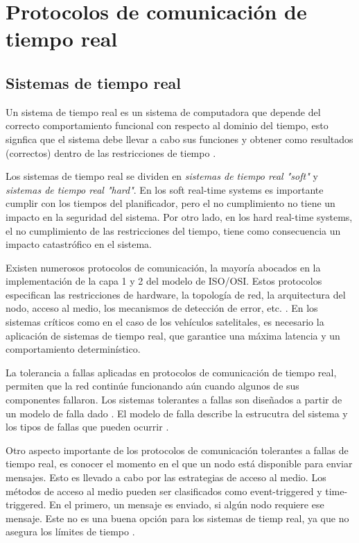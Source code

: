 \section{Protocolos de comunicación de tiempo real}
\subsection{Sistemas de tiempo real}
Un sistema de tiempo real es un sistema de computadora que depende del correcto comportamiento funcional con respecto al dominio del tiempo, esto signfica que el sistema debe llevar a cabo sus funciones y obtener como resultados (correctos) dentro de las restricciones de tiempo \citep{Lisner07}.

Los sistemas de tiempo real se dividen en \textit{sistemas de tiempo real "soft"} y \textit{sistemas de tiempo real "hard"}. En los soft real-time systems es importante cumplir con los tiempos del planificador, pero el no cumplimiento no tiene un impacto en la seguridad del sistema. Por otro lado, en los hard real-time systems, el no cumplimiento de las restricciones del tiempo, tiene como consecuencia un impacto catastrófico en el sistema.

Existen numerosos protocolos de comunicación, la mayoría abocados en  la implementación de la capa 1 y 2 del modelo de ISO/OSI. Estos protocolos especifican las restricciones de hardware, la topología de red, la arquitectura del nodo, acceso al medio, los mecanismos de detección  de error, etc. \citep{Lisner07}. En los sistemas críticos como en el caso de los vehículos satelitales, es necesario la aplicación de sistemas de tiempo real, que garantice una máxima latencia y un comportamiento determinístico.

La tolerancia a fallas aplicadas en protocolos de comunicación de tiempo real, permiten que la red continúe funcionando aún cuando algunos de sus componentes fallaron. Los sistemas tolerantes a fallas son diseñados a partir de un modelo de falla dado \citep{Lisner07}. El modelo de falla describe la estrucutra del sistema y los tipos de fallas que pueden ocurrir \citep{Lisner07}.

Otro aspecto importante de los protocolos de comunicación tolerantes a fallas de tiempo real, es conocer el momento en el que un nodo está disponible para enviar mensajes. Esto es llevado a cabo por las estrategias de acceso al medio. Los métodos de acceso al medio pueden ser clasificados como event-triggered y time-triggered. En el primero, un mensaje es enviado, si algún nodo requiere ese mensaje. Este no es una buena opción para los sistemas de tiemp real, ya que no asegura los límites de tiempo \citep{Lisner07}.

